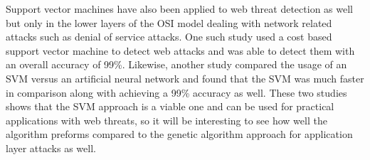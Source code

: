 Support vector machines have also been applied to web threat detection as well but only in the lower layers of the OSI model dealing with network related attacks such as denial of service attacks.  One such study used a cost based support vector machine to detect web attacks and was able to detect them with an overall accuracy of 99\%.%
Likewise, another study compared the usage of an SVM versus an artificial neural network and found that the SVM was much faster in comparison along with achieving a 99\% accuracy as well.%
These two studies shows that the SVM approach is a viable one and can be used for practical applications with web threats, so it will be interesting to see how well the algorithm preforms compared to the genetic algorithm approach for application layer attacks as well.


